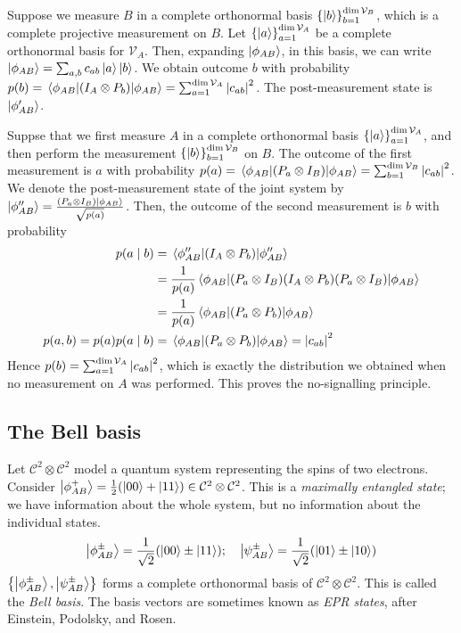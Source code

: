 Suppose we measure \( B \) in a complete orthonormal basis \( \qty{\ket{b}}_{b=1}^{\dim \mathcal V_B} \), which is a complete projective measurement on \( B \).
Let \( \qty{\ket{a}}_{a=1}^{\dim \mathcal V_A} \) be a complete orthonormal basis for \( \mathcal V_A \).
Then, expanding \( \ket{\phi_{AB}} \), in this basis, we can write \( \ket{\phi_{AB}} = \sum_{a,b} c_{ab} \ket{a} \ket{b} \).
We obtain outcome \( b \) with probability \( p(b) = \ev{\qty(I_A \otimes P_b)}{\phi_{AB}} = \sum_{a=1}^{\dim \mathcal V_A} \abs{c_{ab}}^2 \).
The post-measurement state is \( \ket{\phi_{AB}'} \).

Suppse that we first measure \( A \) in a complete orthonormal basis \( \qty{\ket{a}}_{a=1}^{\dim \mathcal V_A} \), and then perform the measurement \( \qty{\ket{b}}_{b=1}^{\dim \mathcal V_B} \) on \( B \).
The outcome of the first measurement is \( a \) with probability \( p(a) = \ev{\qty(P_a \otimes I_B)}{\phi_{AB}} = \sum_{b=1}^{\dim \mathcal V_B} \abs{c_{ab}}^2 \).
We denote the post-measurement state of the joint system by \( \ket{\phi_{AB}''}= \frac{(P_a \otimes I_B) \ket{\phi_{AB}}}{\sqrt{p(a)}} \).
Then, the outcome of the second measurement is \( b \) with probability
\begin{align*}
    p(a \mid b) &= \ev{\qty(I_A \otimes P_b)}{\phi_{AB}''} \\
    &= \frac{1}{p(a)} \ev{(P_a \otimes I_B) (I_A \otimes P_b) (P_a \otimes I_B)}{\phi_{AB}} \\
    &= \frac{1}{p(a)} \ev{(P_a \otimes P_b)}{\phi_{AB}} \\
    p(a,b) = p(a) p(a \mid b) &= \ev{(P_a \otimes P_b)}{\phi_{AB}} = \abs{c_{ab}}^2
\end{align*}
Hence \( p(b) = \sum_{a=1}^{\dim \mathcal V_A} \abs{c_{ab}}^2 \), which is exactly the distribution we obtained when no measurement on \( A \) was performed.
This proves the no-signalling principle.

\subsection{The Bell basis}
Let \( \mathcal C^2 \otimes \mathcal C^2 \) model a quantum system representing the spins of two electrons.
Consider \( \ket{\phi_{AB}^+} = \frac{1}{2}\qty(\ket{00} + \ket{11}) \in \mathcal C^2 \otimes \mathcal C^2 \).
This is a \emph{maximally entangled state}; we have information about the whole system, but no information about the individual states.
\[ \ket{\phi_{AB}^\pm} = \frac{1}{\sqrt{2}} \qty(\ket{00} \pm \ket{11});\quad \ket{\psi_{AB}^\pm} = \frac{1}{\sqrt{2}} \qty(\ket{01} \pm \ket{10}) \]
\( \qty{\ket{\phi_{AB}^\pm}, \ket{\psi_{AB}^\pm}} \) forms a complete orthonormal basis of \( \mathcal C^2 \otimes \mathcal C^2 \).
This is called the \emph{Bell basis}.
The basis vectors are sometimes known as \emph{EPR states}, after Einstein, Podolsky, and Rosen.

